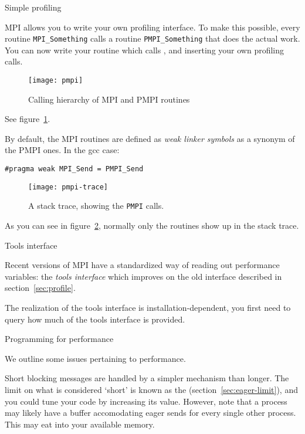 
 {Simple profiling}
\label{sec:profile}

MPI allows you to write your own profiling interface. To make this possible,
every routine \lstinline{MPI_Something} calls a routine \lstinline{PMPI_Something} that 
does the actual work. You can now write your  routine
which calls , and inserting your own profiling calls.
\begin{figure}[ht]
  \texttt{[image: pmpi]}
  \caption{Calling hierarchy of MPI and PMPI routines}
  \label{fig:pmpi-call}
\end{figure}
See figure~\ref{fig:pmpi-call}.

By default, the MPI routines are defined
as
\emph{weak linker symbols}
as a synonym of the PMPI ones. In the gcc case:
\begin{verbatim}
#pragma weak MPI_Send = PMPI_Send
\end{verbatim}
\begin{figure}[ht]
  \texttt{[image: pmpi-trace]}
  \caption{A stack trace, showing the \texttt{PMPI} calls.}
  \label{fig:pmpi-trace}
\end{figure}
As you can see in figure~\ref{fig:pmpi-trace}, normally only the  routines
show up in the stack trace.


 {Tools interface}

Recent versions of MPI have a standardized way of reading out
performance variables: the \emph{tools interface}
which improves on the old interface described in section~\ref{sec:profile}.

The realization of the tools interface is installation-dependent,
you first need to query how much of the tools interface is provided.




 {Programming for performance}

We outline some issues pertaining to performance.


Short blocking messages are handled by a simpler mechanism than
longer. The limit on what is considered `short' is known as the
 (section~\ref{sec:eager-limit}), and you could
tune your code by increasing its value. However, note that a process
may likely have a buffer accomodating eager sends for every single
other process. This may eat into your available memory.


